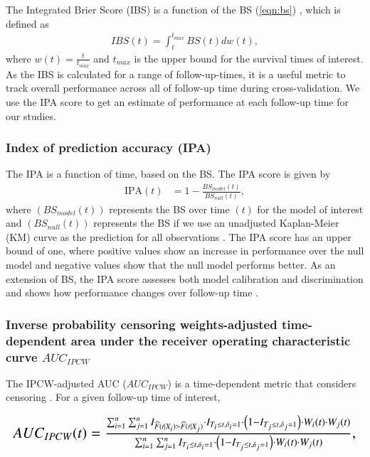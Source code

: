 \documentclass[preprint,12pt]{elsarticle}
\begin{document}
The Integrated Brier Score (IBS) is a function of the BS (\ref{eqn:bs}) \citep{graf1999}, which is defined as \begin{align*}
IBS(t)=\int_{t}^{t_{max}}BS(t)dw(t),
\end{align*} where $w(t)=\frac{t}{t_{max}}$ and $t_{max}$ is the upper bound for the survival times of interest. As the IBS is calculated for a range of follow-up-times,
it is a useful metric to track overall performance across all of follow-up time during cross-validation. We use the
IPA score to get an estimate of performance at each follow-up time for our studies.



\hypertarget{index-of-prediction-accuracy-ipa}{%
\subsubsection{Index of prediction accuracy (IPA)}\label{index-of-prediction-accuracy-ipa}}

The IPA is a function of time, based on the BS. The IPA score is given by \begin{align}
\textrm{IPA}(t) &= 1-\frac{BS_{model}(t)}{BS_{null}(t)}, \nonumber
\end{align} where $(BS_{model}(t))$ represents the BS over time $(t)$ for the model of interest and $(BS_{null}(t))$ represents
the BS if we use an unadjusted Kaplan-Meier (KM) curve as the prediction for all observations \citep{kattan2018index}. The
IPA score has an upper bound of one, where positive values show an increase in performance over the null model and
negative values show that the null model performs better. As an extension of BS, the IPA score assesses both model calibration
and discrimination and shows how performance changes over follow-up time \citep{graf1999} \citep{kattan2018index}.




\hypertarget{auc2}{%
\subsubsection{Inverse probability censoring weights-adjusted time-dependent area under the receiver operating characteristic curve $AUC_{IPCW}$}\label{auc2}}

The IPCW-adjusted AUC ($AUC_{IPCW}$) is a time-dependent metric that considers censoring \citep{auc}. For a given follow-up time of interest,

\begin{equation*}
\resizebox{\hsize}{!}{$AUC_{IPCW}(t)=\frac{\sum^{n}_{i=1}\sum^{n}_{j=1} I_{\widehat{F}(t|X_{i})>\widehat{F}(t|X_{j})} \cdot I_{T_{i}\leq t,\delta_{i}=1} \cdot \left( 1-I_{T_{j}\leq t,\delta_{j}=1} \right) \cdot W_{i}(t) \cdot W_{j}(t)} { \sum^{n}_{i=1}\sum^{n}_{j=1} I_{T_{i}\leq t,\delta_{i}=1} \cdot \left( 1-I_{T_{j}\leq t,\delta_{j}=1} \right) \cdot W_{i}(t) \cdot W_{j}(t) },$}
\end{equation*}
\end{document}
